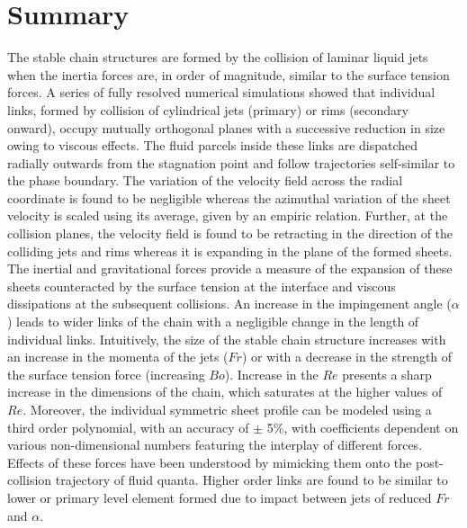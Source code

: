 \section{Summary}
The stable chain structures are formed by the collision of laminar liquid jets when the inertia forces are, in order of magnitude, similar to the surface tension forces. A series of fully resolved numerical simulations showed that individual links, formed by collision of cylindrical jets (primary) or rims (secondary onward), occupy mutually orthogonal planes with a successive reduction in size owing to viscous effects. The fluid parcels inside these links are dispatched radially outwards from the stagnation point and follow trajectories self-similar to the phase boundary. The variation of the velocity field across the radial coordinate is found to be negligible whereas the azimuthal variation of the sheet velocity is scaled using its average, given by an empiric relation. Further, at the collision planes, the velocity field is found to be retracting in the direction of the colliding jets and rims whereas it is expanding in the plane of the formed sheets. The inertial and gravitational forces provide a measure of the expansion of these sheets counteracted by the surface tension at the interface and viscous dissipations at the subsequent collisions. An increase in the impingement angle ($\alpha$) leads to wider links of the chain with a negligible change in the length of individual links. Intuitively, the size of the stable chain structure increases with an increase in the momenta of the jets ($Fr$) or with a decrease in the strength of the surface tension force (increasing $Bo$). Increase in the $Re$ presents a sharp increase in the dimensions of the chain, which saturates at the higher values of $Re$. Moreover, the individual symmetric sheet profile can be modeled using a third order polynomial, with an accuracy of $\pm$ 5\%, with coefficients dependent on various non-dimensional numbers featuring the interplay of different forces. Effects of these forces have been understood by mimicking them onto the post-collision trajectory of fluid quanta. Higher order links are found to be similar to lower or primary level element formed due to impact between jets of reduced $Fr$ and $\alpha$. 
